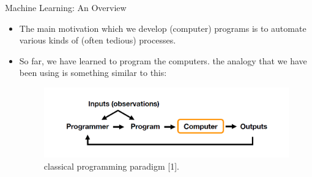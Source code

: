 \documentclass[compress,oilve]{beamer}
\begin{document}


\begin{frame}{Machine Learning: An Overview}
\begin{itemize}
\item The main motivation which we develop (computer) programs is to automate various
kinds of (often tedious) processes.
\item So far, we have learned to program the computers. the analogy that we have been using is something similar to this:\\

\begin{center}
\begin{figure}
\includegraphics[scale=0.5]{1}
\caption{classical programming paradigm [1].}
\end{figure}
\end{center}
\end{itemize}
\end{frame}
\end{document}

